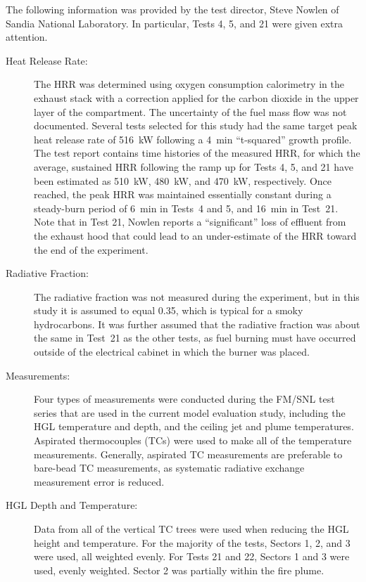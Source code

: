The following information was provided by the test director, Steve Nowlen of Sandia National Laboratory. In particular, Tests 4, 5, and 21 were given extra attention.
\begin{description}
\item[Heat Release Rate:] The HRR was determined using oxygen consumption calorimetry in the exhaust stack with a correction applied for the carbon dioxide in the upper layer of the compartment. The uncertainty of the fuel mass flow was not documented. Several tests selected for this study had the same target peak heat release rate of 516~kW following a 4~min ``t-squared'' growth profile. The test report contains time histories of the measured HRR, for which the average, sustained HRR following the ramp up for Tests 4, 5, and 21 have been estimated as 510~kW, 480~kW, and 470~kW, respectively. Once reached, the peak HRR was maintained essentially constant during a steady-burn period of 6~min in Tests~4 and 5, and 16~min in Test~21. Note that in Test 21, Nowlen reports a ``significant'' loss of effluent from the exhaust hood that could lead to an under-estimate of the HRR toward the end of the experiment.
\item[Radiative Fraction:] The radiative fraction was not measured during the experiment, but in this study it is assumed to equal 0.35, which is typical for a smoky hydrocarbons. It was further assumed that the radiative fraction was about the same in Test~21 as the other tests, as fuel burning must have occurred outside of the electrical cabinet in which the burner was placed.
\item[Measurements:] Four types of measurements were conducted during the FM/SNL test series that are used in the current model evaluation study, including the HGL temperature and depth, and the ceiling jet and plume temperatures. Aspirated thermocouples (TCs) were used to make all of the temperature measurements. Generally, aspirated TC measurements are preferable to bare-bead TC measurements, as systematic radiative exchange measurement error is reduced.
\item[HGL Depth and Temperature:] Data from all of the vertical TC trees were used when reducing the HGL height and temperature. For the majority of the tests, Sectors 1, 2, and 3 were used, all weighted evenly. For Tests 21 and 22, Sectors 1 and 3 were used, evenly weighted. Sector 2 was partially within the fire plume.
\end{description}



